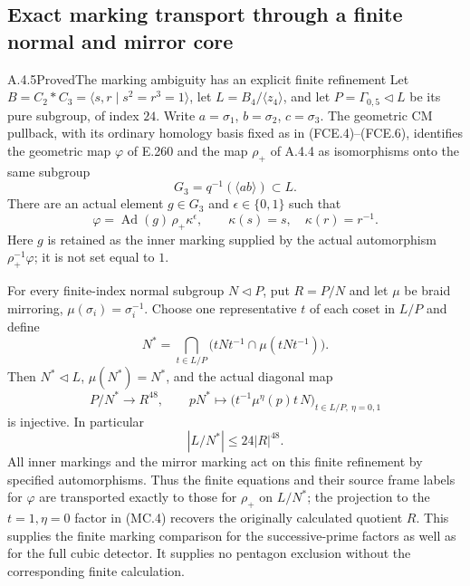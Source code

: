 \subsection{Exact marking transport through a finite normal and mirror core}

\begin{result}{A.4.5}{Proved}{The marking ambiguity has an explicit finite refinement}
Let $B=C_2*C_3=\langle s,r\mid s^2=r^3=1\rangle$, let
$L=B_4/\langle z_4\rangle$, and let $P=\Gamma_{0,5}\triangleleft L$
be its pure subgroup, of index $24$.  Write $a=\sigma _1$,
$b=\sigma _2$, $c=\sigma _3$.  The geometric CM pullback, with its
ordinary homology basis fixed as in (FCE.4)--(FCE.6), identifies the geometric map
$\varphi$ of E.260 and the map $\rho_+$ of A.4.4 as isomorphisms
onto the same subgroup
\[
 G_3=q^{-1}(\langle ab\rangle)\subset L.                 \tag{MC.1}
\]
There are an actual element $g\in G_3$ and $\epsilon\in\{0,1\}$
such that
\[
 \varphi=\operatorname{Ad}(g)\,\rho_+\kappa^\epsilon,
 \qquad \kappa(s)=s,\quad \kappa(r)=r^{-1}.              \tag{MC.2}
\]
Here $g$ is retained as the inner marking supplied by the actual
automorphism $\rho_+^{-1}\varphi$; it is not set equal to $1$.

For every finite-index normal subgroup $N\triangleleft P$, put
$R=P/N$ and let $\mu$ be braid mirroring, $\mu(\sigma_i)=\sigma_i^{-1}$.
Choose one representative $t$ of each coset in $L/P$ and define
\[
 N^*=\bigcap_{t\in L/P}\bigl(tNt^{-1}\cap\mu(tNt^{-1})\bigr).
                                                               \tag{MC.3}
\]
Then $N^*\triangleleft L$, $\mu(N^*)=N^*$, and the actual diagonal
map
\[
 P/N^*\longrightarrow R^{48},\qquad
 pN^*\longmapsto
 \bigl(t^{-1}\mu^\eta(p)t\,N\bigr)_{t\in L/P,\ \eta=0,1}
                                                               \tag{MC.4}
\]
is injective.  In particular
\[
 |L/N^*|\leq 24|R|^{48}.                                \tag{MC.5}
\]
All inner markings and the mirror marking act on this finite
refinement by specified automorphisms.  Thus the finite equations
and their source frame labels for $\varphi$ are transported exactly
to those for $\rho_+$ on $L/N^*$; the projection to the $t=1,\eta=0$
factor in (MC.4) recovers the originally calculated quotient $R$.
This supplies the finite marking comparison for the successive-prime
factors as well as for the full cubic detector.  It supplies no
pentagon exclusion without the corresponding finite calculation.
\end{result}

